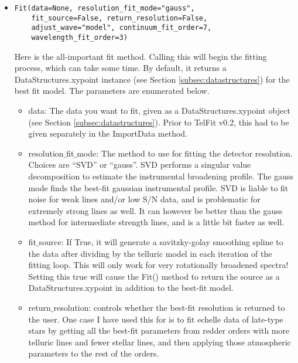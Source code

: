 \documentclass{article}
\begin{document}
\begin{itemize}
  \item \begin{Verbatim}[commandchars=\\\{\}]
Fit(data=None, resolution_fit_mode="gauss", 
    fit_source=False, return_resolution=False, 
    adjust_wave="model", continuum_fit_order=7, 
    wavelength_fit_order=3)
    \end{Verbatim}
    Here is the all-important fit method. Calling this will begin the fitting process, which can take some time. By default, it returns a DataStructures.xypoint instance (see Section \ref{subsec:datastructures}) for the best fit model. The parameters are enumerated below.
    
    \begin{itemize}

      \item data: The data you want to fit, given as a DataStructures.xypoint object (see Section \ref{subsec:datastructures}). Prior to TelFit v0.2, this had to be given separately in the ImportData method.
    
      \item resolution$\_$fit$\_$mode: The method to use for fitting the detector resolution. Choices are ``SVD'' or ``gauss''. SVD performs a singular value decomposition to estimate the instrumental broadening profile. The gauss mode finds the best-fit gaussian instrumental profile. SVD is liable to fit noise for weak lines and/or low S/N data, and is problematic for extremely strong lines as well. It can however be better than the gauss method for intermediate strength lines, and is a little bit faster as well.
      
      \item fit$\_$source: If True, it will generate a savitzky-golay smoothing spline to the data after dividing by the telluric model in each iteration of the fitting loop. This will only work for very rotationally broadened spectra! Setting this true will cause the Fit() method to return the source as a DataStructures.xypoint in addition to the best-fit model.

      \item return$\_$resolution: controls whether the best-fit resolution is returned to the user. One case I have used this for is to fit echelle data of late-type stars by getting all the best-fit parameters from redder orders with more telluric lines and fewer stellar lines, and then applying those atmospheric parameters to the rest of the orders.
      

\end{itemize}
\end{itemize}
\end{document}
